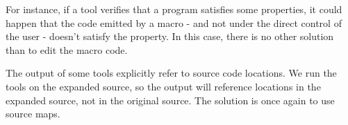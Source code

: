 For instance, if a tool verifies that a program satisfies some properties, it
could happen that the code emitted by a macro - and not under the direct control
of the user - doesn't satisfy the property. In this case, there is no other
solution than to edit the macro code.

The output of some tools explicitly refer to source code locations. We run the
tools on the expanded source, so the output will reference locations in the
expanded source, not in the original source. The solution is once again to use
source maps.






